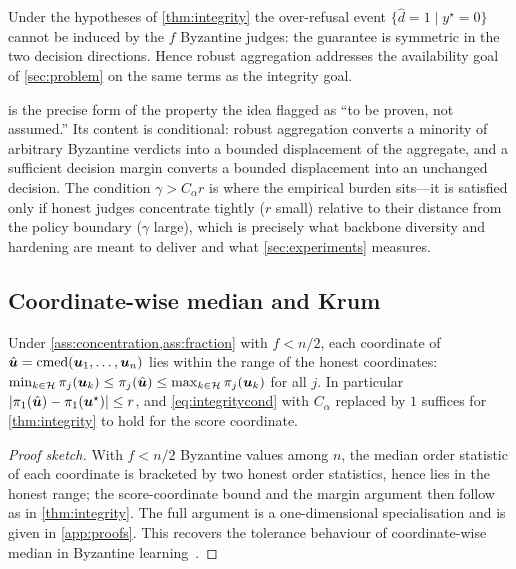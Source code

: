 \begin{corollary}[Availability]
\label{cor:availability}
Under the hypotheses of \cref{thm:integrity} the over-refusal event $\{\hat d=1\mid
y^\star=0\}$ cannot be induced by the $f$ Byzantine judges: the guarantee is symmetric in
the two decision directions. Hence robust aggregation addresses the availability goal of
\cref{sec:problem} on the same terms as the integrity goal.
\end{corollary}

 is the precise form of the property the idea flagged as
``to be proven, not assumed.'' Its content is conditional: robust aggregation converts a
minority of arbitrary Byzantine verdicts into a bounded displacement of the aggregate, and
a sufficient decision margin converts a bounded displacement into an unchanged decision.
The condition $\gamma>C_\alpha r$ is where the empirical burden sits—it is satisfied only
if honest judges concentrate tightly ($r$ small) relative to their distance from the
policy boundary ($\gamma$ large), which is precisely what backbone diversity and hardening
are meant to deliver and what \cref{sec:experiments} measures.

\subsection{Coordinate-wise median and Krum}
\begin{proposition}
\label{prop:cmed}
Under \cref{ass:concentration,ass:fraction} with $f<n/2$, each coordinate of
$\hat{\bm{u}}=\operatorname{cmed}(\bm{u}_1,\dots,\bm{u}_n)$ lies within the range of the honest coordinates:
$\min_{k\in\mathcal{H}}\pi_j(\bm{u}_k)\le \pi_j(\hat{\bm{u}})\le \max_{k\in\mathcal{H}}\pi_j(\bm{u}_k)$ for all
$j$. In particular $|\pi_1(\hat{\bm{u}})-\pi_1(\bm{u}^{\star})|\le r$, and \cref{eq:integritycond} with
$C_\alpha$ replaced by $1$ suffices for \cref{thm:integrity} to hold for the score
coordinate.
\end{proposition}
\begin{proof}[Proof sketch]
With $f<n/2$ Byzantine values among $n$, the median order statistic of each coordinate is
bracketed by two honest order statistics, hence lies in the honest range; the
score-coordinate bound and the margin argument then follow as in \cref{thm:integrity}. The
full argument is a one-dimensional specialisation and is given in \cref{app:proofs}. This
recovers the tolerance behaviour of coordinate-wise median in Byzantine
learning~\cite{yin2018byzantine}.
\end{proof}

